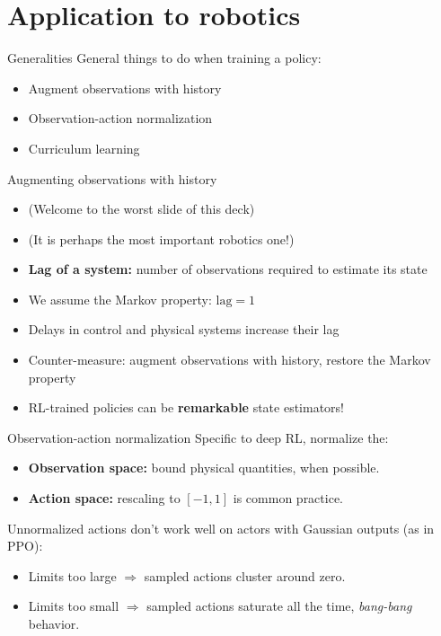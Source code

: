 \documentclass[10pt, aspectratio=1610]{beamer}
\begin{document}
\section{Application to robotics}

\begin{frame}{Generalities}
    General things to do when training a policy:
    \begin{itemize}
        \item Augment observations with history
        \item Observation-action normalization
        \item Curriculum learning
    \end{itemize}
\end{frame}

\begin{frame}{Augmenting observations with history}
    \begin{itemize}
        \item (Welcome to the worst slide of this deck)
        \item (It is perhaps the most important robotics one!)
        \item \textbf{Lag of a system:} number of observations required to estimate its state
        \item We assume the Markov property: $\mathrm{lag} = 1$
        \item Delays in control and physical systems increase their lag
        \item Counter-measure: augment observations with history, restore the Markov property
        \item RL-trained policies can be \textbf{remarkable} state estimators!
    \end{itemize}
\end{frame}

\begin{frame}{Observation-action normalization}
    Specific to deep RL, normalize the:
    \begin{itemize}
        \item \textbf{Observation space:} bound physical quantities, when possible.
        \item \textbf{Action space:} rescaling to $[-1, 1]$ is common practice.
    \end{itemize}
    Unnormalized actions don't work well on actors with Gaussian outputs (as in PPO):
    \begin{itemize}
        \item Limits too large $\Rightarrow$ sampled actions cluster around zero.
        \item Limits too small $\Rightarrow$ sampled actions saturate all the time, \emph{bang-bang} behavior.
    \end{itemize}
\end{frame}
\end{document}
